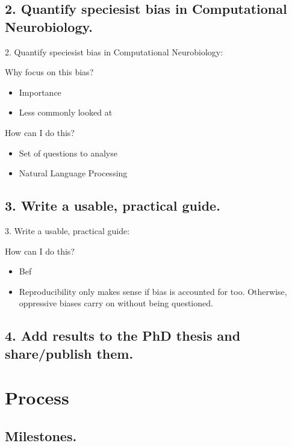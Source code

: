 \documentclass[t]{beamer}
\begin{document}
\subsection{2. Quantify speciesist bias in Computational Neurobiology.}
\begin{frame}{2. Quantify speciesist bias in Computational Neurobiology:}
	\begin{block}{Why focus on this bias?}
  		\begin{itemize}    
  			\item Importance
  			\item Less commonly looked at
  		\end{itemize}    
	\end{block}
 
	\begin{block}{How can I do this?}
  		\begin{itemize}    
  			\item Set of questions to analyse
  			\item Natural Language Processing
  		\end{itemize}    
	\end{block}
\end{frame}

\subsection{3. Write a usable, practical guide.}
\begin{frame}{3. Write a usable, practical guide:}
	\begin{block}{How can I do this?}
        \hfill \break
  		\begin{itemize}    
  			\item Bef
  			\item Reproducibility only makes sense if bias is accounted for too. Otherwise, oppressive biases carry on without being questioned.
  		\end{itemize}    
	\end{block}
\end{frame}
\subsection{4. Add results to the PhD thesis and share/publish them.}

\section{Process}
\subsection{Milestones.}
\end{document}
